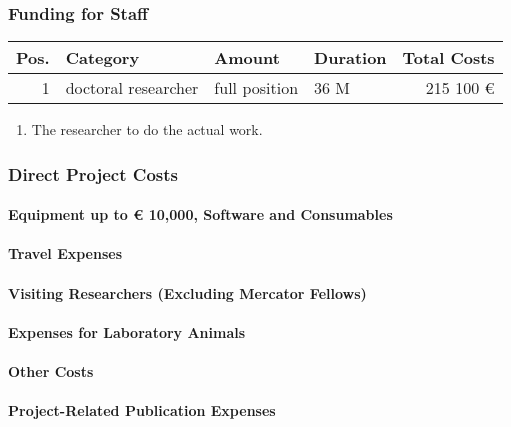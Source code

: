 \documentclass[de]{dfg-proposal}
\begin{document}
\subsubsection{Funding for Staff}

\begin{tabularx}{\linewidth}{rXllr}
    \toprule
    Pos. & Category                                  & Amount       & Duration & Total Costs \\
    \midrule
    1    & doctoral researcher & full position & 36 M  & 215 100 €    \\
    \bottomrule
\end{tabularx}

\begin{enumerate}
    \item The researcher to do the actual work.
\end{enumerate}

\subsubsection{Direct Project Costs}

\paragraph{Equipment up to € 10,000, Software and Consumables}

\paragraph{Travel Expenses}

\paragraph{Visiting Researchers (Excluding Mercator Fellows)}

\paragraph{Expenses for Laboratory Animals}

\paragraph{Other Costs}

\paragraph{Project-Related Publication Expenses}
\end{document}
